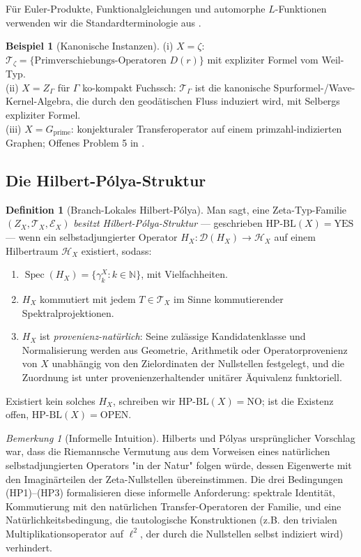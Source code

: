 \documentclass[11pt]{article}
\theoremstyle{definition}
\newtheorem{definition}[theorem]{Definition}
\newtheorem{example}[theorem]{Beispiel}
\theoremstyle{remark}
\newtheorem{remark}[theorem]{Bemerkung}
\newcommand{\HBL}{\mathrm{HP\text{-}BL}}
\newcommand{\Spec}{\operatorname{Spec}}
\begin{document}
Für Euler-Produkte, Funktionalgleichungen und automorphe $L$-Funktionen
verwenden wir die Standardterminologie aus \cite{IwaniecKowalski}.

\begin{example}[Kanonische Instanzen]\label{ex:canonical}
(i) $X = \zeta$: $\mathcal{T}_\zeta = \{\text{Primverschiebungs-Operatoren } D(r)\}$ mit expliziter Formel vom Weil-Typ.\\
(ii) $X = Z_\Gamma$ für $\Gamma$ ko-kompakt Fuchssch: $\mathcal{T}_\Gamma$
ist die kanonische Spurformel-/Wave-Kernel-Algebra, die durch den
geodätischen Fluss induziert wird, mit Selbergs expliziter Formel.\\
(iii) $X = G_\mathrm{prime}$: konjekturaler Transferoperator auf einem
primzahl-indizierten Graphen; Offenes Problem 5 in \cite{Geiger2026RHIII}.
\end{example}

\subsection{Die Hilbert-P\'olya-Struktur}

\begin{definition}[Branch-Lokales Hilbert-P\'olya]\label{def:hp-bl}
Man sagt, eine Zeta-Typ-Familie $(Z_X, \mathcal{T}_X, \mathcal{E}_X)$
\emph{besitzt Hilbert-P\'olya-Struktur} --- geschrieben $\HBL(X) = \mathrm{YES}$ ---
wenn ein selbstadjungierter Operator $H_X : \mathcal{D}(H_X) \to \mathcal{H}_X$ auf
einem Hilbertraum $\mathcal{H}_X$ existiert, sodass:
\begin{enumerate}
\item[(HP1)] $\Spec(H_X) = \{\gamma_k^X : k \in \mathbb{N}\}$, mit Vielfachheiten.
\item[(HP2)] $H_X$ kommutiert mit jedem $T \in \mathcal{T}_X$ im Sinne
  kommutierender Spektralprojektionen.
\item[(HP3)] $H_X$ ist \emph{provenienz-natürlich}: Seine zulässige
  Kandidatenklasse und Normalisierung werden aus Geometrie, Arithmetik
  oder Operatorprovenienz von $X$ unabhängig von den Zielordinaten der
  Nullstellen festgelegt, und die Zuordnung ist unter
  provenienzerhaltender unitärer Äquivalenz funktoriell.
\end{enumerate}
Existiert kein solches $H_X$, schreiben wir $\HBL(X) = \mathrm{NO}$;
ist die Existenz offen, $\HBL(X) = \mathrm{OPEN}$.
\end{definition}

\begin{remark}[Informelle Intuition]\label{rem:hp-informal}
Hilberts und P\'olyas ursprünglicher Vorschlag war, dass die Riemannsche
Vermutung aus dem Vorweisen eines natürlichen selbstadjungierten Operators
"in der Natur" folgen würde, dessen Eigenwerte mit den Imaginärteilen der
Zeta-Nullstellen übereinstimmen. Die drei Bedingungen (HP1)--(HP3)
formalisieren diese informelle Anforderung: spektrale Identität, Kommutierung mit den
natürlichen Transfer-Operatoren der Familie, und eine Natürlichkeitsbedingung,
die tautologische Konstruktionen (z.B. den trivialen Multiplikationsoperator
auf $\ell^2$, der durch die Nullstellen selbst indiziert wird) verhindert.
\end{remark}
\end{document}
